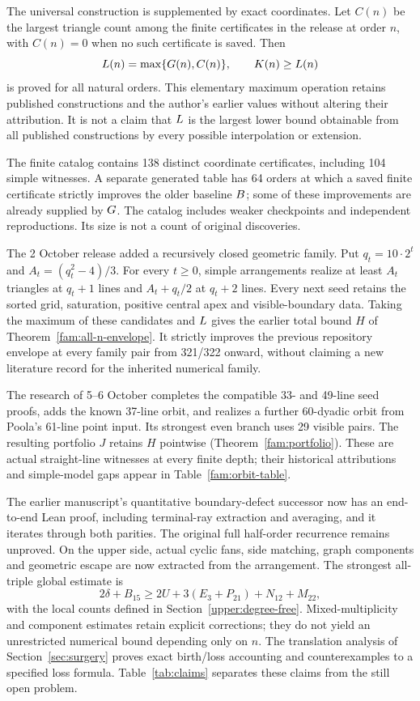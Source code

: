 The universal construction is supplemented by exact coordinates. Let $C(n)$ be the largest triangle count among the finite certificates in the release at order $n$, with $C(n)=0$ when no such certificate is saved. Then
\begin{equation}\label{eq:envelope}
L(n)=\max\{G(n),C(n)\},\qquad K(n)\ge L(n)
\end{equation}
is proved for all natural orders. This elementary maximum operation retains published constructions and the author's earlier values without altering their attribution. It is not a claim that $L$ is the largest lower bound obtainable from all published constructions by every possible interpolation or extension.

The finite catalog contains 138 distinct coordinate certificates, including 104 simple witnesses. A separate generated table has 64 orders at which a saved finite certificate strictly improves the older baseline $B$; some of these improvements are already supplied by $G$. The catalog includes weaker checkpoints and independent reproductions. Its size is not a count of original discoveries.

The 2 October release added a recursively closed geometric family. Put
$q_t=10\cdot2^t$ and $A_t=(q_t^2-4)/3$. For every $t\ge0$, simple
arrangements realize at least $A_t$ triangles at $q_t+1$ lines and
$A_t+q_t/2$ at $q_t+2$ lines. Every next seed retains the sorted grid,
saturation, positive central apex and visible-boundary data. Taking
the maximum of these candidates and $L$ gives the earlier total
bound $H$ of Theorem~\ref{fam:all-n-envelope}. It strictly improves
the previous repository envelope at every family pair from 321/322
onward, without claiming a new literature record for the inherited
numerical family.

The research of 5--6 October completes the compatible 33- and 49-line
seed proofs, adds the known 37-line orbit, and realizes a further
60-dyadic orbit from Poola's 61-line point input. Its strongest even
branch uses 29 visible pairs. The resulting portfolio $J$ retains $H$
pointwise (Theorem~\ref{fam:portfolio}). These are actual straight-line
witnesses at every finite depth; their historical attributions and
simple-model gaps appear in Table~\ref{fam:orbit-table}.

The earlier manuscript's quantitative boundary-defect successor now has
an end-to-end Lean proof, including terminal-ray extraction and averaging,
and it iterates through both parities. The original full half-order
recurrence remains unproved. On the upper side, actual cyclic fans,
side matching, graph components and geometric escape are now extracted
from the arrangement. The strongest all-triple global estimate is
\[
 2\delta+B_{15}\ge2U+3(E_3+P_{21})+N_{12}+M_{22},
\]
with the local counts defined in Section~\ref{upper:degree-free}.
Mixed-multiplicity and component estimates retain explicit corrections;
they do not yield an unrestricted numerical bound depending only on $n$.
The translation analysis of Section~\ref{sec:surgery} proves exact
birth/loss accounting and counterexamples to a specified loss formula.
Table~\ref{tab:claims} separates these claims from the still open problem.

